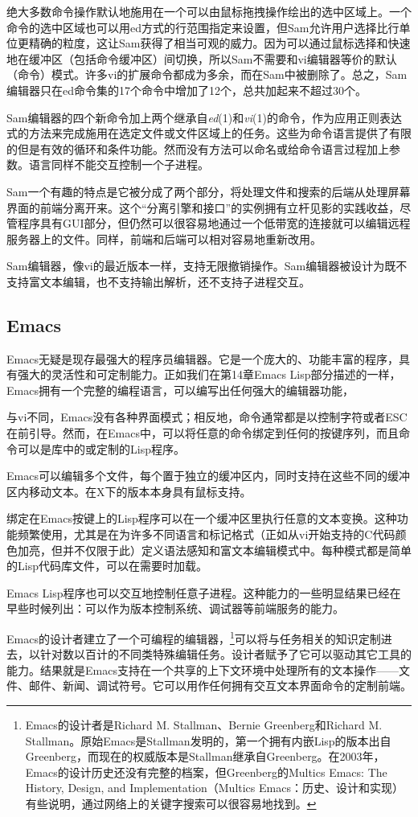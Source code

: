 \documentclass[12pt,oneside]{book}
\begin{document}
绝大多数命令操作默认地施用在一个可以由鼠标拖拽操作绘出的选中区域上。一个命令的选中区域也可以用ed方式的行范围指定来设置，但Sam允许用户选择比行单位更精确的粒度，这让Sam获得了相当可观的威力。因为可以通过鼠标选择和快速地在缓冲区（包括命令缓冲区）间切换，所以Sam不需要和vi编辑器等价的默认（命令）模式。许多vi的扩展命令都成为多余，而在Sam中被删除了。总之，Sam编辑器只在ed命令集的17个命令中增加了12个，总共加起来不超过30个。

Sam编辑器的四个新命令加上两个继承自\textit{ed}(1)和\textit{vi}(1)的命令，作为应用正则表达式的方法来完成施用在选定文件或文件区域上的任务。这些为命令语言提供了有限的但是有效的循环和条件功能。然而没有方法可以命名或给命令语言过程加上参数。语言同样不能交互控制一个子进程。

Sam一个有趣的特点是它被分成了两个部分，将处理文件和搜索的后端从处理屏幕界面的前端分离开来。这个“分离引擎和接口”的实例拥有立杆见影的实践收益，尽管程序具有GUI部分，但仍然可以很容易地通过一个低带宽的连接就可以编辑远程服务器上的文件。同样，前端和后端可以相对容易地重新改用。

Sam编辑器，像vi的最近版本一样，支持无限撤销操作。Sam编辑器被设计为既不支持富文本编辑，也不支持输出解析，还不支持子进程交互。

\subsection{Emacs}
Emacs无疑是现存最强大的程序员编辑器。它是一个庞大的、功能丰富的程序，具有强大的灵活性和可定制能力。正如我们在第14章Emacs Lisp部分描述的一样，Emacs拥有一个完整的编程语言，可以编写出任何强大的编辑器功能，

与vi不同，Emacs没有各种界面模式；相反地，命令通常都是以控制字符或者ESC在前引导。然而，在Emacs中，可以将任意的命令绑定到任何的按键序列，而且命令可以是库中的或定制的Lisp程序。

Emacs可以编辑多个文件，每个置于独立的缓冲区内，同时支持在这些不同的缓冲区内移动文本。在X下的版本本身具有鼠标支持。

绑定在Emacs按键上的Lisp程序可以在一个缓冲区里执行任意的文本变换。这种功能频繁使用，尤其是在为许多不同语言和标记格式（正如从vi开始支持的C代码颜色加亮，但并不仅限于此）定义语法感知和富文本编辑模式中。每种模式都是简单的Lisp代码库文件，可以在需要时加载。

Emacs Lisp程序也可以交互地控制任意子进程。这种能力的一些明显结果已经在早些时候列出：可以作为版本控制系统、调试器等前端服务的能力。

Emacs的设计者建立了一个可编程的编辑器，\footnote{Emacs的设计者是Richard M. Stallman、Bernie Greenberg和Richard M. Stallman。原始Emacs是Stallman发明的，第一个拥有内嵌Lisp的版本出自Greenberg，而现在的权威版本是Stallman继承自Greenberg。在2003年，Emacs的设计历史还没有完整的档案，但Greenberg的Multics Emacs: The History, Design, and Implementation（Multics Emacs：历史、设计和实现）有些说明，通过网络上的关键字搜索可以很容易地找到。}可以将与任务相关的知识定制进去，以针对数以百计的不同类特殊编辑任务。设计者赋予了它可以驱动其它工具的能力。结果就是Emacs支持在一个共享的上下文环境中处理所有的文本操作——文件、邮件、新闻、调试符号。它可以用作任何拥有交互文本界面命令的定制前端。
\end{document}
